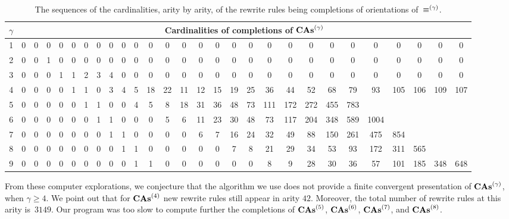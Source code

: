 \begin{table}[ht]
    \centering
    \footnotesize
    \setlength{\tabcolsep}{.35em}
    \begin{tabular}{c||ccccccccccccccccccccccccccc}
        $\gamma$ & \multicolumn{27}{c}{
        Cardinalities of completions of $\mathbf{CAs}^{\left(\gamma\right)}$}
        \\ \hline \hline
        1 & 0 & 0 & 0 & 0 & 0 & 0 & 0 & 0 & 0 & 0 & 0 & 0 & 0 & 0 & 0
        & 0 & 0 & 0 & 0 & 0 & 0 & 0 & 0 & 0 & 0 & 0 & 0
        \\
        2 & 0 & 0 & 1 & 0 & 0 & 0 & 0 & 0 & 0 & 0 & 0 & 0 & 0 & 0 & 0
        & 0 & 0 & 0 & 0 & 0 & 0 & 0 & 0 & 0 & 0 & 0 & 0
        \\
        3 & 0 & 0 & 0 & 1 & 1 & 2 & 3 & 4 & 0 & 0 & 0 & 0 & 0 & 0 & 0
        & 0 & 0 & 0 & 0 & 0 & 0 & 0 & 0 & 0 & 0 & 0 & 0
        \\
        4 & 0 & 0 & 0 & 0 & 1 & 1 & 0 & 3 & 4 & 5 & 18 & 22 & 11 & 12
        & 15 & 19 & 25 & 36 & 44 & 52 & 68 & 79 & 93 & 105 & 106 & 109
        & 107
        \\
        5 & 0 & 0 & 0 & 0 & 0 & 1 & 1 & 0 & 0 & 4 & 5 & 8 & 18 & 31
        & 36 & 48 & 73 & 111 & 172 & 272 & 455 & 783
        \\
        6 & 0 & 0 & 0 & 0 & 0 & 0 & 1 & 1 & 0 & 0 & 0 & 5 & 6 & 11
        & 23 & 30 & 48 & 73 & 117 & 204 & 348 & 589 & 1004
        \\
        7 & 0 & 0 & 0 & 0 & 0 & 0 & 0 & 1 & 1 & 0 & 0 & 0 & 0 & 6 & 7
        & 16 & 24 & 32 & 49 & 88 & 150 & 261 & 475 & 854
        \\
        8 & 0 & 0 & 0 & 0 & 0 & 0 & 0 & 0 & 1 & 1 & 0 & 0 & 0 & 0 & 0
        & 7 & 8 & 21 & 29 & 34 & 53 & 93 & 172 & 311 & 565
        \\
        9 & 0 & 0 & 0 & 0 & 0 & 0 & 0 & 0 & 0 & 1 & 1 & 0 & 0 & 0 & 0
        & 0 & 0 & 8 & 9 & 28 & 30 & 36 & 57 & 101 & 185 & 348 & 648
    \end{tabular}
    \caption{\footnotesize
    The sequences of the cardinalities, arity by arity, of the rewrite
    rules being completions of orientations of~$\operatorname{\equiv}^{\left(\gamma\right)}$.}
    \label{tab:cardinalities_completion_CAs}
\end{table}

From these computer explorations, we conjecture that the algorithm we
use does not provide a finite convergent presentation of $\mathbf{CAs}^{\left(\gamma\right)}$,
when $\gamma \geq 4$. We point out that for $\mathbf{CAs}^{\left(4\right)}$ new rewrite
rules still appear in arity $42$. Moreover, the total number of rewrite
rules at this arity is~$3149$. Our program was too slow to
compute further the completions of $\mathbf{CAs}^{\left(5\right)}$, $\mathbf{CAs}^{\left(6\right)}$, $\mathbf{CAs}^{\left(7\right)}$, and
$\mathbf{CAs}^{\left(8\right)}$.
\medbreak

